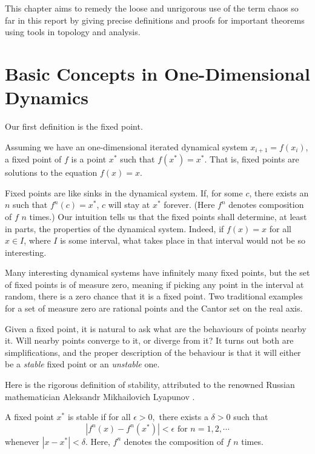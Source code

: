 This chapter aims to remedy the loose and unrigorous use of the term chaos so far in this report by giving precise definitions and proofs for important theorems using tools in topology and analysis.

\section{Basic Concepts in One-Dimensional Dynamics}

Our first definition is the fixed point.

\begin{defn}
	Assuming we have an one-dimensional iterated dynamical system $x_{i+1} = f(x_i)$, a fixed point of $f$ is a point $x^*$ such that $f(x^*) = x^*$. 
	That is, fixed points are solutions to the equation $f(x) = x$.
\end{defn}

Fixed points are like sinks in the dynamical system. 
If, for some $c$, there exists an $n$ such that $f^n(c) = x^*$, $c$ will stay at $x^*$ forever. (Here $f^n$ denotes composition of $f$ $n$ times.) 
Our intuition tells us that the fixed points shall determine, at least in parts, the properties of the dynamical system.
Indeed, if $f(x) = x$ for all $x \in I$, where $I$ is some interval, what takes place in that interval would not be so interesting.

Many interesting dynamical systems have infinitely many fixed points, but the set of fixed points is of measure zero, meaning if picking any point in the interval at random, there is a zero chance that it is a fixed point.
Two traditional examples for a set of measure zero are rational points and the Cantor set on the real axis. 

Given a fixed point, it is natural to ask what are the behaviours of points nearby it.
Will nearby points converge to it, or diverge from it?
It turns out both are simplifications, and the proper description of the behaviour is that it will either be a \emph{stable} fixed point or an \emph{unstable} one. 

Here is the rigorous definition of stability, attributed to the renowned Russian mathematician Aleksandr Mikhailovich Lyapunov \cite{lyapunov}.

\begin{defn}
A fixed point $x^*$ is stable if for all $\epsilon>0,$ there exists a $\delta>0$ such that 
$$
	|f^n(x) - f^n(x^*)| < \epsilon \text{ for } n = 1,2, \cdots 
$$
whenever $|x - x^*| < \delta$.
Here, $f^n$ denotes the composition of $f$ $n$ times.
\end{defn}

